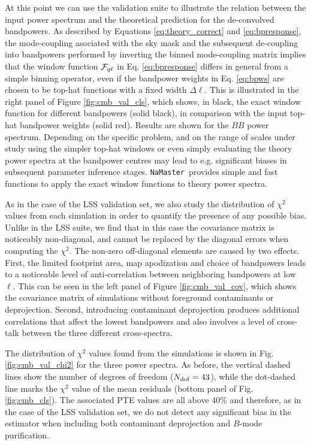 \documentclass[usenatbib]{mnrasb}
\newcommand{\nmt}{{\tt NaMaster}}
\begin{document}
      At this point we can use the validation suite to illustrate the relation between the input power spectrum and the theoretical prediction for the de-convolved bandpowers. As described by Equations \ref{eq:theory_correct} and \ref{eq:bpresponse}, the mode-coupling asociated with the sky mask and the subsequent de-coupling into bandpowers performed by inverting the binned mode-coupling matrix implies that the window function ${\cal F}_{q\ell}$ in Eq. \ref{eq:bpresponse} differs in general from a simple binning operator, even if the bandpower weights in Eq. \ref{eq:bpws} are chosen to be top-hat functions with a fixed width $\Delta\ell$. This is illustrated in the right panel of Figure \ref{fig:cmb_val_cls}, which shows, in black, the exact window function for different bandpowers (solid black), in comparison with the input top-hat bandpower weights (solid red). Results are shown for the $BB$ power spectrum. Depending on the specific problem, and on the range of scales under study using the simpler top-hat windows or even simply evaluating the theory power spectra at the bandpower centres may lead to e.g. significant biases in subsequent parameter inference stages. \nmt~provides simple and fast functions to apply the exact window functions to theory power spectra.
      
      As in the case of the LSS validation set, we also study the distribution of $\chi^2$ values from each simulation in order to quantify the presence of any possible bias. Unlike in the LSS suite, we find that in this case the covariance matrix is noticeably non-diagonal, and cannot be replaced by the diagonal errors when computing the $\chi^2$. The non-zero off-diagonal elements are caused by two effects. First, the limited footprint area, map apodization and choice of bandpowers leads to a noticeable level of anti-correlation between neighboring bandpowers at low $\ell$. This can be seen in the left panel of Figure \ref{fig:cmb_val_cov}, which shows the covariance matrix of simulations without foreground contaminants or deprojection. Second, introducing contaminant deprojection produces additional correlations that affect the lowest bandpowers and also involves a level of cross-talk between the three different cross-spectra.
      
      The distribution of $\chi^2$ values found from the simulations is shown in Fig. \ref{fig:cmb_val_chi2} for the three power spectra. As before, the vertical dashed lines show the number of degrees of freedom ($N_{\rm dof}=43$), while the  dot-dashed line marks the $\chi^2$ value of the mean residuals (bottom panel of Fig. \ref{fig:cmb_cls}). The associated PTE values are all above $40\%$ and therefore, as in the case of the LSS validation set, we do not detect any significant bias in the estimator when including both contaminant deprojection and $B$-mode purification.
\end{document}
